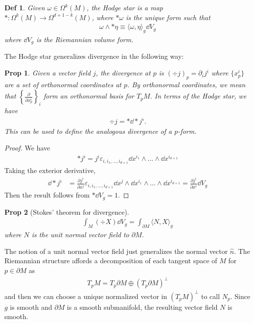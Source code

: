 \documentclass[11pt]{article}
\newtheorem{defn}{Def}
\newtheorem{prop}{Prop}
\renewcommand{\epsilon}{\varepsilon}
\begin{document}
\begin{defn}
  Given $ \omega \in \Omega^k(M)$, the Hodge star is a map $*:\Omega^k(M) \to
  \Omega^{d+1-k}(M)$, where $*\omega$ is the unique form such that
  \begin{align}
    \omega \wedge *\eta \equiv \langle \omega, \eta \rangle_g \dd V_g
  \end{align}
 where 
  $\dd V_g$ is the Riemannian volume form.
\end{defn}
The Hodge star generalizes divergence in the following way:
\begin{prop}
  Given a vector field $j$, the divergence at $p$ is $(\div j)_p =
  \partial_ij^i$ where $\{x^i_p\}$ are a set of orthonormal coordinates at $p$.
  By orthonormal coordinates, we mean that $\left\{\frac{\partial}{\partial x^i_p}\right\}_i$ form an
  orthonormal basis for $T_pM$. In terms of the Hodge star, we have
  \begin{align}
\div j = *\dd*j^\flat .
\end{align}
This can be used to define the analogous divergence of a $p$-form.
\end{prop}

\begin{proof}
We have
\begin{align}
* j^\flat = j^i\epsilon_{i, i_1, \ldots, i_{d+1}} \dd x^{i_1} \wedge \ldots \wedge \dd x^{i_{d+1}}
\end{align}
Taking the exterior derivative,
\begin{align}
  \dd * j^\flat &= \frac{\partial j^i}{\partial x^j} \epsilon_{i, i_1, \ldots, i_{d+1}} \dd x^j \wedge \dd x^{i_1} \wedge \ldots \wedge \dd x^{i_{d+1}}
  = \frac{\partial j^i}{\partial x^i}\dd V_g
\end{align}
Then the result follows from $* \dd V_g = 1$.
\end{proof}

\begin{prop}[Stokes' theorem for divergence]
\begin{align}
  \int_M (\div X)\dd V_g = \int_{\partial M}\langle  N, X \rangle_g
\end{align}
where $N$ is the unit normal vector field to $\partial M$.
\end{prop}

The notion of a unit normal vector field just generalizes the normal vector
$\hat n$. The
Riemannian structure affords a decomposition of each tangent space of $M$ for $p
\in \partial M$ as
\begin{align}
  T_p M = T_p \partial M \oplus (T_p \partial M)^\perp
\end{align}
and then we can choose a unique normalized vector in $(T_p M)^\perp$ to call
$N_p$. Since $g$ is smooth and $\partial M$ is a smooth submanifold, the
resulting vector field $N$ is smooth.
\end{document}
